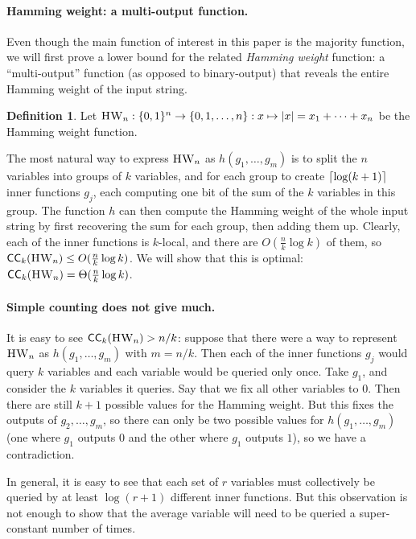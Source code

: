 \documentclass[10pt,a4paper]{article}
\theoremstyle{definition}
\newtheorem{definition}[lemma]{Definition}
\theoremstyle{remark}
\newcommand{\mathsc}[1]{{\normalfont\textsc{#1}}}
\DeclarePairedDelimiter{\ceil}{\lceil}{\rceil}
\DeclarePairedDelimiter{\set}{\{}{\}}
\DeclareMathOperator{\HW}{\mathsc{HW}}
\newcommand{\zo}{\set{0,1}}
\newcommand{\CC}{\mathsf{CC}}
\begin{document}
\paragraph*{Hamming weight: a multi-output function.}
Even though the main function of interest in this paper is the majority function, we will first
prove a lower bound for the related \emph{Hamming weight} function: a ``multi-output'' function (as opposed to binary-output) that reveals the entire Hamming weight of the input string.
\begin{definition}
Let $\HW_n : \zo^n \to \set{0,1,\ldots, n} : x \mapsto |x| = x_1 + \cdots + x_n$ be the Hamming weight function.
\end{definition}

The most natural way to
express $\HW_n$ as $h(g_1, \ldots, g_m)$
is to split the $n$ variables into groups of $k$ variables, and for each group to create $\ceil{\log (k+1)}$ inner functions $g_j$, each computing one bit of the sum of the $k$ variables in this group.
The function $h$ can then compute the Hamming weight of the whole input string by first recovering the sum for each group, then adding them up.
Clearly, each of the inner functions is $k$-local,
and there are $O(\frac{n}{k}\log k)$ of them, so $\CC_k(\HW_n) \leq O(\frac{n}{k}\log k)$.
We will show that this is optimal: $\CC_k(\HW_n) = \Theta(\frac{n}{k}\log k)$.


\paragraph*{Simple counting does not give much.}
It is easy to see $\CC_k(\HW_n)>n/k$:
suppose that there were a way to represent $\HW_n$ as $h(g_1, \ldots, g_m)$ with $m=n/k$.
Then each of the inner functions $g_j$ would query $k$ variables and each variable would be queried only once.
Take $g_1$, and consider the $k$ variables it queries.
Say that we fix all other variables to $0$.
Then there are still $k+1$ possible values for the Hamming weight.
But this fixes the outputs of $g_2,\ldots, g_m$, so there can only be two possible values for $h(g_1, \ldots, g_m)$ (one where $g_1$ outputs $0$ and the other where $g_1$ outputs $1$), so we have a contradiction.

In general, it is easy to see that each set of $r$ variables must collectively be queried by at least $\log(r+1)$ different inner functions.
But this observation is not enough to show that the average variable will need to be queried a super-constant number of times.
\end{document}
